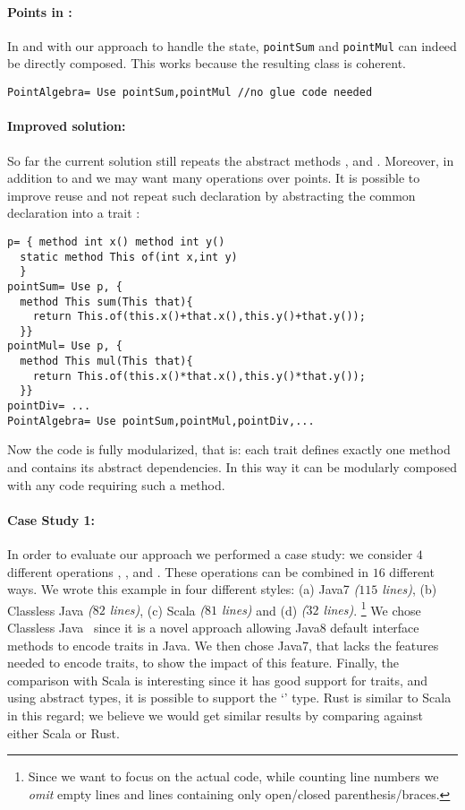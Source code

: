 \paragraph{Points in \name:}
In \name and with our approach to handle the state, 
\lstinline{pointSum} and \lstinline{pointMul} can indeed be directly composed.
This works because the resulting class is coherent.

\begin{lstlisting}
PointAlgebra= Use pointSum,pointMul //no glue code needed
\end{lstlisting}  


\paragraph{Improved solution:} So far the current solution still
  repeats the abstract methods \Q@x@, \Q@y@ and \Q@of@.
  Moreover, in addition to \Q@sum@ and \Q@mul@ we may want many
  operations over points. It is possible to improve reuse
  and not repeat such declaration by abstracting the common
  declaration into a trait \Q@p@: 

\begin{lstlisting}
p= { method int x() method int y()
  static method This of(int x,int y)
  }
pointSum= Use p, { 
  method This sum(This that){
    return This.of(this.x()+that.x(),this.y()+that.y());
  }}
pointMul= Use p, { 
  method This mul(This that){
    return This.of(this.x()*that.x(),this.y()*that.y());
  }}
pointDiv= ...
PointAlgebra= Use pointSum,pointMul,pointDiv,...
\end{lstlisting}
      
Now the code is fully modularized, that is: each trait defines exactly one method and contains its abstract dependencies. In this way it can be modularly composed with any code requiring such a method.

\paragraph{Case Study 1:}
In order to evaluate our approach
we performed a case study:
we consider $4$ different operations \Q@Sum@, \Q@Subtraction@, \Q@Multiplication@ and \Q@Division@.
These operations can be combined in $16$ different ways.
We wrote this example in four different styles:
(a) Java7 \emph{($115$ lines)},
(b) Classless Java \emph{($82$ lines)},
(c) Scala \emph{($81$ lines)} and (d) \name \emph{($32$ lines)}.%
\footnote{
Since we want to focus on the actual code, while counting line numbers we \emph{omit} empty lines and lines containing only open/closed
parenthesis/braces.
}
We chose Classless Java~\cite{wang2016classless} since it is a novel approach allowing
Java8 default interface methods to encode traits in Java.
We then chose Java7, that lacks the features needed to encode traits, to show the impact of this feature.
Finally, the comparison with Scala is interesting 
since
it has good support for traits, and using abstract types, it is possible to support the `\Q@This@' type.
Rust is similar to Scala in this regard; we believe we would get similar results by comparing against either Scala or Rust.


